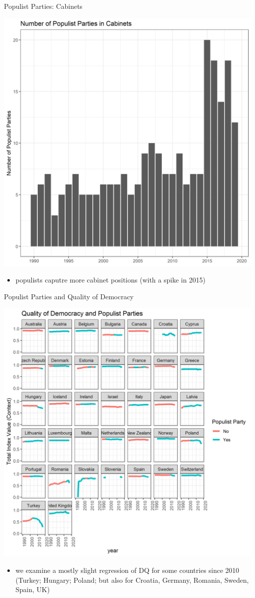 \documentclass[
  ignorenonframetext,
]{beamer}
\providecommand{\tightlist}{%
  \setlength{\itemsep}{0pt}\setlength{\parskip}{0pt}}
\begin{document}
\begin{frame}{Populist Parties: Cabinets}
\protect\hypertarget{populist-parties-cabinets}{}

\begin{center}\includegraphics[width=0.5\linewidth]{PNG/party_cabinet} \end{center}

\begin{itemize}
\tightlist
\item
  populists caputre more cabinet positions (with a spike in 2015)
\end{itemize}

\end{frame}

\begin{frame}{Populist Parties and Quality of Democracy}
\protect\hypertarget{populist-parties-and-quality-of-democracy}{}

\begin{center}\includegraphics[width=0.9\linewidth,height=0.7\textheight]{PNG/Total_index_pop.png} \end{center}

\begin{itemize}
\tightlist
\item
  we examine a mostly slight regression of DQ for some countries since
  2010 (Turkey; Hungary; Poland; but also for Croatia, Germany, Romania,
  Sweden, Spain, UK)
\end{itemize}

\end{frame}
\end{document}
